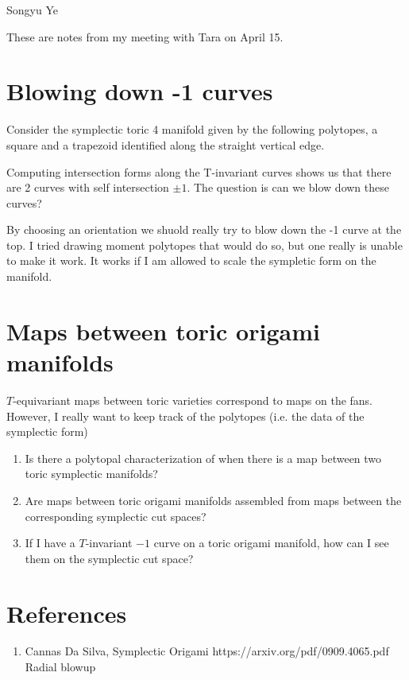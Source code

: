 \documentclass[12pt]{article}
\begin{document}
Songyu Ye

These are notes from my meeting with Tara on April 15. 

\section{Blowing down -1 curves}
Consider the symplectic toric 4 manifold given by the following polytopes, a square and 
a trapezoid identified along the straight vertical edge. 

\hfill

Computing intersection forms along the T-invariant curves shows us that there are 2 curves
with self intersection $\pm 1$. The question is can we blow down these curves?

\hfill 

By choosing an orientation we shuold really try to blow down the -1 curve at the top.
I tried drawing moment polytopes that would do so, but one really is unable to make it work.
It works if I am allowed to scale the sympletic form on the manifold.

\section{Maps between toric origami manifolds}
$T$-equivariant maps between toric varieties correspond to maps on the fans.
However, I really want to keep track of the polytopes (i.e. the data of the symplectic form)

\begin{remark}
    \begin{enumerate}
        \item Is there a polytopal characterization of when there is a map between two
        toric symplectic manifolds?
        \item Are maps between toric origami manifolds assembled from maps 
        between the corresponding symplectic cut spaces?
        \item If I have a $T$-invariant $-1$ curve on a toric origami manifold, how can I 
        see them on the symplectic cut space?
    \end{enumerate}
\end{remark}


\section{References}
\begin{enumerate}
    \item Cannas Da Silva, Symplectic Origami https://arxiv.org/pdf/0909.4065.pdf Radial blowup
\end{enumerate}
\end{document}
